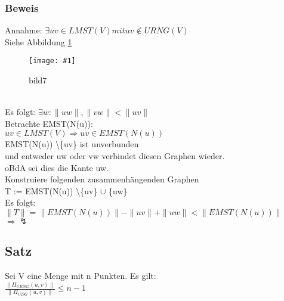 \documentclass{article}
\newcommand{\bild}[4]{ %
	\begin{figure}[h!]
		\centering
		\texttt{[image: \#1]}
		\caption{#3}
		\label{#4}
	\end{figure}	
}
\newcommand{\sieheBild}[4]{
	Siehe Abbildung \ref{#4}
	\bild{#1}{#2}{#3}{#4}
}
\newcommand{\doubleAbs}[1]{
	\|#1\|
}
\begin{document}
\subsubsection*{Beweis}
Annahme: $\exists uv \in LMST(V) mit uv \not\in URNG(V)$
\\
\sieheBild{Bilder/7.png}{0.4}{bild7}{Bild 7}\\
Es folgt: $\exists w : \doubleAbs{uw}, \doubleAbs{vw} < \doubleAbs{uv}$\\
Betrachte EMST(N(u)):\\
$uv \in LMST(V) \Rightarrow uv \in EMST(N(u))$\\
EMST(N(u)) \textbackslash \{uv\} ist unverbunden\\
und entweder uw oder vw verbindet diesen Graphen wieder.\\
oBdA sei dies die Kante uw.\\
Konstruiere folgenden zusammenhängenden Graphen
\\
T := EMST(N(u)) \textbackslash \{uv\} $\cup$ \{uw\}\\
Es folgt: $\doubleAbs{T} = \doubleAbs{EMST(N(u))} - \doubleAbs{uv} + \doubleAbs{uw} < \doubleAbs{EMST(N(u))}$\\
$ \Rightarrow \lightning$

\subsection*{Satz}
Sei V eine Menge mit n Punkten. Es gilt:\\
$\frac{\doubleAbs{\Pi_{URNG}(u,v)}}{\doubleAbs{\Pi_{UDG}(u,v)}} \leq n-1 $
\end{document}
